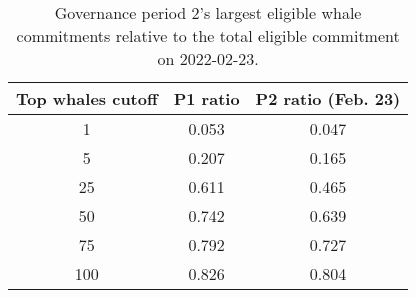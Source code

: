 %
\begin{longtable}[c]{ c c c }
\caption{Governance period 2's largest eligible whale commitments relative to the total eligible commitment on 2022-02-23.} \\
\hline
\textbf{Top whales cutoff} & \textbf{P1 ratio} & \textbf{P2 ratio (Feb. 23)} \\
\hline
1 & 0.053 & 0.047 \\ 
5 & 0.207 & 0.165 \\ 
25 & 0.611 & 0.465 \\ 
50 & 0.742 & 0.639 \\ 
75 & 0.792 & 0.727 \\ 
100 & 0.826 & 0.804 \\ 
\hline 
\end{longtable} 
